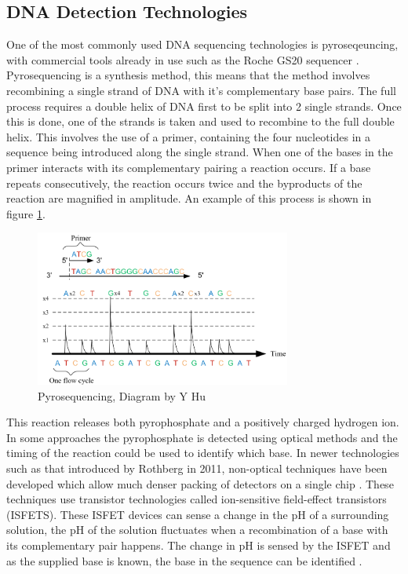\subsection{DNA Detection Technologies}
One of the most commonly used DNA sequencing technologies is pyroseqeuncing, with commercial tools already in use such as the Roche GS20 sequencer \cite{huse2007accuracy}. Pyrosequencing is a synthesis method, this means that the method involves recombining a single strand of DNA with it's complementary base pairs. The full process requires a double helix of DNA first to be split into 2 single strands. Once this is done, one of the strands is taken and used to recombine to the full double helix. This involves the use of a primer, containing the four nucleotides in a sequence being introduced along the single strand. When one of the bases in the primer interacts with its complementary pairing a reaction occurs. If a base repeats consecutively, the reaction occurs twice and the byproducts of the reaction are magnified in amplitude. An example of this process is shown in figure \ref{fig:pyro}.


\begin{figure}[h]
  \centering
  \includegraphics[width=0.75\textwidth]{./figs/pyrosequencing.png}
  \caption{Pyrosequencing, Diagram by Y Hu \cite{hu2012cmos}}
  \label{fig:pyro}
\end{figure}
This reaction releases both pyrophosphate and a positively charged hydrogen ion. In some approaches the pyrophosphate is detected using optical methods and the timing of the reaction could be used to identify which base. In newer technologies such as that introduced by Rothberg in 2011, non-optical techniques have been developed which allow much denser packing of detectors on a single chip \cite{rothberg2011integrated}. These techniques use transistor technologies called ion-sensitive field-effect transistors (ISFETS). These ISFET devices can sense a change in the pH of a surrounding solution, the pH of the solution fluctuates when a recombination of a base with its complementary pair happens. The change in pH is sensed by the ISFET and as the supplied base is known, the base in the sequence can be identified \cite{wong2010pg}.


